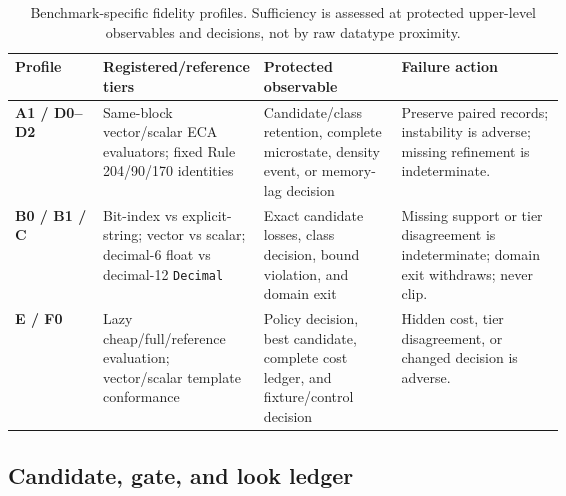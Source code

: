 \begin{table}[htbp]
\centering
\scriptsize
\caption{Benchmark-specific fidelity profiles. Sufficiency is assessed at protected
upper-level observables and decisions, not by raw datatype proximity.}
\label{tab:full-fidelity}
\begin{tabularx}{\linewidth}{>{\bfseries}p{0.16\linewidth}
>{\raggedright\arraybackslash}p{0.23\linewidth}
>{\raggedright\arraybackslash}p{0.25\linewidth}X}
\toprule
Profile & Registered/reference tiers & Protected observable & Failure action\\
\midrule
A1 / D0--D2 & Same-block vector/scalar ECA evaluators; fixed Rule 204/90/170 identities &
Candidate/class retention, complete microstate, density event, or memory-lag decision &
Preserve paired records; instability is adverse; missing refinement is indeterminate.\\
B0 / B1 / C & Bit-index vs explicit-string; vector vs scalar; decimal-6 float vs decimal-12
\texttt{Decimal} &
Exact candidate losses, class decision, bound violation, and domain exit &
Missing support or tier disagreement is indeterminate; domain exit withdraws; never clip.\\
E / F0 & Lazy cheap/full/reference evaluation; vector/scalar template conformance &
Policy decision, best candidate, complete cost ledger, and fixture/control decision &
Hidden cost, tier disagreement, or changed decision is adverse.\\
\bottomrule
\end{tabularx}
\end{table}

\subsection{Candidate, gate, and look ledger}

